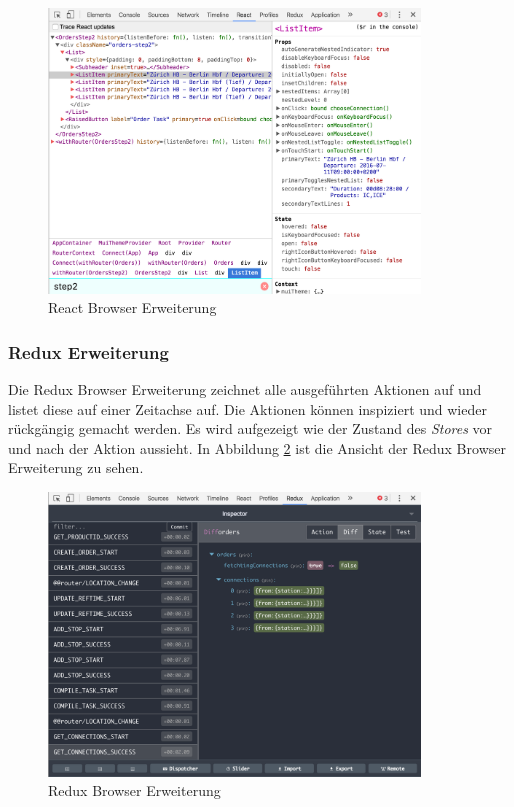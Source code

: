 \begin{figure}[ht]
	\centering
  \includegraphics[width=0.88\textwidth]{images/reactext.png}
	\caption{React Browser Erweiterung}
	\label{fig:reactext}
\end{figure}

\subsubsection{Redux Erweiterung}
Die Redux Browser Erweiterung zeichnet alle ausgeführten Aktionen auf und listet diese auf einer Zeitachse auf. Die Aktionen können inspiziert und wieder rückgängig gemacht werden. Es wird aufgezeigt wie der Zustand des \textit{Stores} vor und nach der Aktion aussieht. In Abbildung \ref{fig:reduxext} ist die Ansicht der Redux Browser Erweiterung zu sehen.

\begin{figure}[H]
	\centering
  \includegraphics[width=0.88\textwidth]{images/reduxext.png}
	\caption{Redux Browser Erweiterung}
	\label{fig:reduxext}
\end{figure}



